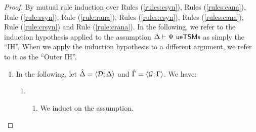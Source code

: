\begin{proof} By mutual rule induction over Rules (\ref{rules:esyn}), Rules (\ref{rules:eana}), Rule (\ref{rule:rsyn}), Rule (\ref{rule:rana}), Rules (\ref{rules:csyn}), Rules (\ref{rules:cana}), Rule (\ref{rule:crsyn}) and Rule (\ref{rule:crana}). In the following, we refer to the induction hypothesis applied to the assumption $\Delta \vdash \Psi~\mathsf{ueTSMs}$ as simply the ``IH''. When we apply the induction hypothesis to a different argument, we refer to it as the ``Outer IH''.

\begin{enumerate}
  \item In the following, let $\hat{\Delta}=\langle \mathcal{D}; \Delta \rangle$ and $\hat{\Gamma}=\langle \mathcal{G}; \Gamma \rangle$. We have:
  \begin{enumerate}
    \item \begin{enumerate}
      \item We induct on the assumption.
\end{enumerate}
\end{enumerate}
\end{enumerate}
\end{proof}
